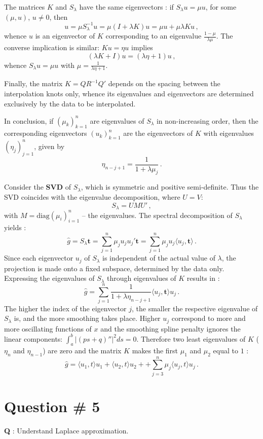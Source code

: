 \documentclass[a4paper]{article}
\begin{document}
The matrices $K$ and $S_\lambda$ have the same eigenvectors : if $S_\lambda u = \mu u$,
for some $(\mu, u)$, $u\neq 0$, then
\[
u
= \mu S_\lambda^{-1} u
= \mu (I+\lambda K) u
= \mu u + \mu \lambda K u\,,
\]
whence $u$ is an eigenvector of $K$ corresponding to an eigenvalue $\frac{1-\mu}{\lambda \mu}$.
The converse implication is similar: $K u = \eta u$ implies
\[ ( \lambda K + I ) u = ( \lambda \eta + 1 ) u \,, \]
whence $S_\lambda u = \mu u$ with $\mu = \frac{1}{\lambda \eta + 1}$.

Finally, the matrix $K = Q R^{-1} Q'$ depends on the spacing between the interpolation
knots only, whence its eigenvalues and eigenvectors are determined exclusively by the
data to be interpolated.

In conclusion, if $(\mu_k)_{k=1}^n$ are eigenvalues of $S_\lambda$ in non-increasing
order, then the corresponding eigenvectors $(u_k)_{k=1}^n$ are the eigenvectors
of $K$ with eigenvalues $(\eta_j)_{j=1}^n$, given by 
\[ \eta_{n-j+1} = \frac{1}{1 + \lambda \mu_j} \,. \]

Consider the \textbf{SVD} of $S_\lambda$, which is symmetric and positive semi-definite.
Thus the SVD coincides with the eigenvalue decomposition, where $U = V$: 
\[ S_\lambda = U M U' \,, \]
with $M = \text{diag}(\mu_i)_{i=1}^n$ -- the eigenvalues. The spectral decomposition
of $S_\lambda$ yields :
\[
\hat{g}
= S_\lambda \mathbf{t}
= \sum_{j=1}^n \mu_j u_j u_j' \mathbf{t}
= \sum_{j=1}^n \mu_j u_j \langle u_j, \mathbf{t} \rangle\,.
\]
Since each eigenvector $u_j$ of $S_\lambda$ is independent of the actual value
of $\lambda$, the projection is made onto a fixed subspace, determined by the data
only.
Expressing the eigenvalues of $S_\lambda$ through eigenvalues of $K$ results in :
\[
\hat{g}
= \sum_{j=1}^n \frac{1}{1 + \lambda \eta_{n-j+1}} \langle u_j, \mathbf{t} \rangle u_j \,.
\]
The higher the index of the eigenvector $j$, the smaller the respective eigenvalue
of $S_\lambda$ is, and the more smoothing takes place. Higher $u_j$ correspond to
more and more oscillating functions of $x$ and the smoothing spline penalty ignores
the linear components: $\int_a^b | (p s + q)'' |^2 ds = 0$. Therefore two least
eigenvalues of $K$ ($\eta_n$ and $\eta_{n-1}$) are zero and the matrix $K$ makes
the first $\mu_1$ and $\mu_2$ equal to $1$ :
\[
\hat{g} =
\langle u_1, t \rangle u_1 + \langle u_2, t \rangle u_2 +
+ \sum_{j=3}^n \mu_j \langle u_j, t \rangle u_j\,.
\]

\clearpage

\section{Question \# 5} %
\label{sec:question_5}
\textbf{\large \textbf{Q}} : Understand Laplace approximation.
\end{document}
